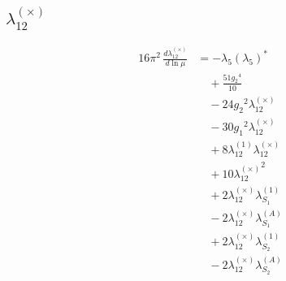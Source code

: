 \documentclass[10pt,a4paper]{article}
\begin{document}
\subsection*{$\lambda_{12}^{(\times)}$}
\begin{align*}
16\pi^2\,\frac{d \lambda_{12}^{(\times)}}{d\ln\mu} &=-{\lambda_5} \left({\lambda_5}\right)^{*} \\
&\quad +\frac{51 {g_2}^4}{10} \\
&\quad -24 {g_2}^2 {\lambda_{12}^{(\times)}} \\
&\quad -30 {g_1}^2 {\lambda_{12}^{(\times)}} \\
&\quad +8 {\lambda_{12}^{(1)}} {\lambda_{12}^{(\times)}} \\
&\quad +10 {\lambda_{12}^{(\times)}}^2 \\
&\quad +2 {\lambda_{12}^{(\times)}} {\lambda_{S_1}^{(1)}} \\
&\quad -2 {\lambda_{12}^{(\times)}} {\lambda_{S_1}^{(A)}} \\
&\quad +2 {\lambda_{12}^{(\times)}} {\lambda_{S_2}^{(1)}} \\
&\quad -2 {\lambda_{12}^{(\times)}} {\lambda_{S_2}^{(A)}} \\
\end{align*}
\end{document}
